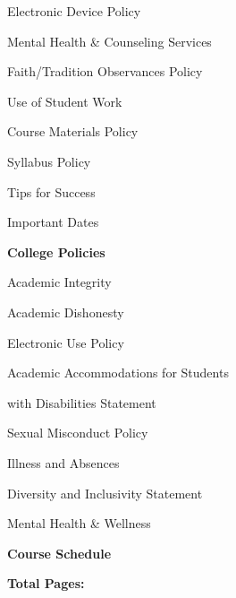 \documentclass[11pt,letterpaper]{article}
\begin{document}
\begin{minipage}[t]{0.45\textwidth}
\hspace{0.3cm} Electronic Device Policy \dotfill \pageref{electronic} 
%
\end{minipage}\hfill\begin{minipage}[t]{0.45\textwidth} \par
\hspace{0.3cm} Mental Health \& Counseling Services \dotfill \pageref{mental_health} \par
\hspace{0.3cm} Faith/Tradition Observances Policy \dotfill \pageref{faith} \par
\hspace{0.3cm} Use of Student Work \dotfill \pageref{std_work} \par
\hspace{0.3cm} Course Materials Policy \dotfill \pageref{copyright} \par
\hspace{0.3cm} Syllabus Policy \dotfill \pageref{syllabus} \par
\hspace{0.3cm} Tips for Success \dotfill \pageref{tips} \par
\hspace{0.3cm} Important Dates \dotfill \pageref{imp_dates} \par
{\bfseries\color{stacred} College Policies} \dotfill \pageref{college_polc} \par
\hspace{0.3cm} Academic Integrity \dotfill \pageref{college_acadint} \par
\hspace{0.3cm} Academic Dishonesty \dotfill \pageref{college_acaddis} \par
\hspace{0.3cm} Electronic Use Policy \dotfill \pageref{college_elecuse} \par
\hspace{0.3cm} Academic Accommodations for Students \par
\hspace{0.6cm} with Disabilities Statement \dotfill \pageref{college_acadacc} \par
\hspace{0.3cm} Sexual Misconduct Policy \dotfill \pageref{college_sexmisconduct} \par
\hspace{0.3cm} Illness and Absences \dotfill \pageref{college_illnessabsences} \par
\hspace{0.3cm} Diversity and Inclusivity Statement \dotfill \pageref{college_inclusive} \par
\hspace{0.3cm} Mental Health \& Wellness \dotfill \pageref{mental_wellness} \par
{\bfseries\color{stacred} Course Schedule} \dotfill \pageref{schd} \par
\hfill {\bfseries\color{stacred} Total Pages:} \pageref*{LastPage}
\end{minipage}
\sectionbreak
\end{document}

